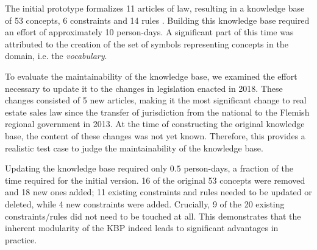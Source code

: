 The initial prototype formalizes 11 articles of law, resulting in a knowledge base of 53 concepts, 6 constraints and 14 rules \cite{ruleml/DeryckHVV18}. Building this knowledge base required an effort of approximately 10 person-days.
A significant part of this time was attributed to the creation of the set of symbols representing concepts in the domain, i.e. the \emph{vocabulary}. 

To evaluate the maintainability of the knowledge base, we examined the effort necessary to update it to the changes in legislation enacted in 2018. 
These changes consisted of 5 new articles, making it the most significant change to real estate sales law since the transfer of jurisdiction from the national to the Flemish regional government in 2013. 
At the time of constructing the original knowledge base, the content of these changes was not yet known.
Therefore, this provides a realistic test case to judge the maintainability of the knowledge base.

Updating the knowledge base required only $0.5$ person-days, a fraction of the time required for the initial version. 
16 of the original 53 concepts were removed and 18 new ones added; 11 existing constraints and rules needed to be updated or deleted, while 4 new constraints were added. 
Crucially, 9 of the 20 existing constraints/rules did not need to be touched at all. 
This demonstrates that the inherent modularity of the KBP indeed leads to significant advantages in practice.